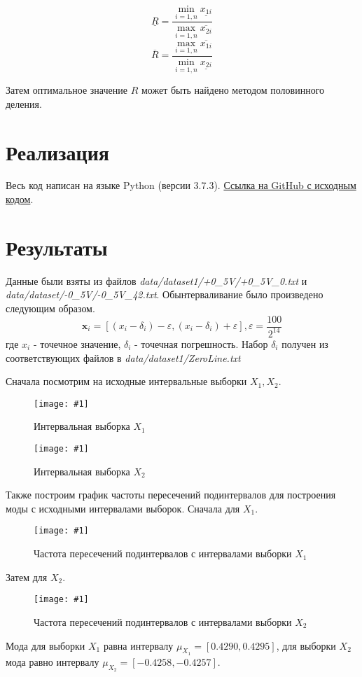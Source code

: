\documentclass[a4paper,12pt]{article}
\newcommand{\plot}[3]{
    \begin{figure}[H]
        \begin{center}
            \texttt{[image: \#1]}
            \caption{#2}
            \label{#3}
        \end{center}
    \end{figure}
}
\begin{document}
    \begin{equation}
        \underline{R} = \frac{\min_{i=1,n}\underline{x_{1i}}}{\max_{i=1,n}\overline{x_{2i}}}
    \end{equation}
    \begin{equation}
        \overline{R} = \frac{\max_{i=1,n}\overline{x_{1i}}}{\min_{i=1,n}\underline{x_{2i}}}
    \end{equation}

    Затем оптимальное значение $ R $ может быть найдено методом половинного деления.

    \section{Реализация}
    \quad Весь код написан на языке Python (версии 3.7.3).
    \href{https://github.com/kirillkuks/Intervals/tree/master/lab1}{Ссылка на GitHub с исходным кодом}.

    \section{Результаты}
    \quad Данные были взяты из файлов \textsl{data/dataset1/+0\_5V/+0\_5V\_0.txt} и \textsl{data/dataset/-0\_5V/-0\_5V\_42.txt}.
    Обынтерваливание было произведено следующим образом.
    \begin{equation}
        \textbf{x}_i = [(x_i - \delta_i) - \varepsilon, (x_i - \delta_i) + \varepsilon], \varepsilon = \frac{100}{2^{14}}
    \end{equation}
    где $ x_i $ - точечное значение, $ \delta_i $ - точечная погрешность.
    Набор $ \delta_i $ получен из соответствующих файлов в \textsl{data/dataset1/ZeroLine.txt}
    
    Сначала посмотрим на исходные интервальные выборки $ X_1, X_2 $.
    \plot{_X1}{Интервальная выборка $ X_1 $}{p:x1}
    \plot{_X2}{Интервальная выборка $ X_2 $}{p:x2}

    Также построим график частоты пересечений подинтервалов для построения моды с исходными интервалами выборок.
    Сначала для $ X_1 $.
    \plot{_ModaX1Hist}{Частота пересечений подинтервалов с интервалами выборки $ X_1 $}{p:modaX1}

    Затем для $ X_2 $.
    \plot{_ModaX2Hist}{Частота пересечений подинтервалов с интервалами выборки $ X_2 $}{p:modaX2}

    Мода для выборки $ X_1 $ равна интервалу $ \mu_{X_1} = [0.4290, 0.4295] $,
    для выборки $ X_2 $ мода равно интервалу $ \mu_{X_2} = [-0.4258, -0.4257] $.
\end{document}
